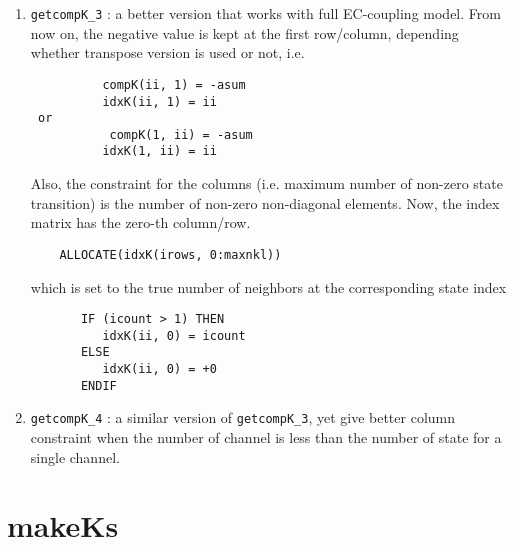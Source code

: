 \begin{enumerate}
  \item \verb!getcompK_3! : a better version that works with full EC-coupling
  model. From now on, the negative value is kept at the first row/column,
  depending whether transpose version is used or not, i.e.
  \begin{verbatim}
          compK(ii, 1) = -asum
          idxK(ii, 1) = ii
 or
           compK(1, ii) = -asum
          idxK(1, ii) = ii 
  \end{verbatim} 
	Also, the constraint for the columns (i.e. maximum number of non-zero state
	transition) is the number of non-zero non-diagonal elements. 
Now, the index matrix has the zero-th column/row.
\begin{verbatim}
    ALLOCATE(idxK(irows, 0:maxnkl))
\end{verbatim}
which is set to the true number of neighbors at the corresponding state index
\begin{verbatim}
       IF (icount > 1) THEN
          idxK(ii, 0) = icount
       ELSE
          idxK(ii, 0) = +0
       ENDIF
\end{verbatim}

\item \verb!getcompK_4! : a similar version of \verb!getcompK_3!, yet give
better column constraint when the number of channel is less than the number of
state for a single channel. 
\end{enumerate}


\section{makeKs}
\label{sec:makeKs}

